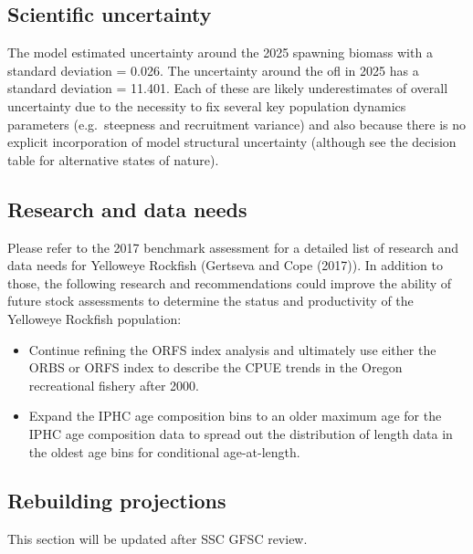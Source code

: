 \documentclass[
]{scrartcl}
\providecommand{\tightlist}{%
  \setlength{\itemsep}{0pt}\setlength{\parskip}{0pt}}\usepackage{longtable,booktabs,array}
\begin{document}
\subsection*{Scientific uncertainty}\label{scientific-uncertainty}

The model estimated uncertainty around the 2025 spawning biomass with a
standard deviation = 0.026. The uncertainty around the \gls{ofl} in 2025
has a standard deviation = 11.401. Each of these are likely
underestimates of overall uncertainty due to the necessity to fix
several key population dynamics parameters (e.g.~steepness and
recruitment variance) and also because there is no explicit
incorporation of model structural uncertainty (although see the decision
table for alternative states of nature).

\subsection*{Research and data needs}\label{research-and-data-needs}

Please refer to the 2017 benchmark assessment for a detailed list of
research and data needs for Yelloweye Rockfish (Gertseva and Cope
(2017)). In addition to those, the following research and
recommendations could improve the ability of future stock assessments to
determine the status and productivity of the Yelloweye Rockfish
population:

\begin{itemize}
\tightlist
\item
  Continue refining the ORFS index analysis and ultimately use either
  the ORBS or ORFS index to describe the CPUE trends in the Oregon
  recreational fishery after 2000.
\item
  Expand the IPHC age composition bins to an older maximum age for the
  IPHC age composition data to spread out the distribution of length
  data in the oldest age bins for conditional age-at-length.
\end{itemize}

\subsection*{Rebuilding projections}\label{rebuilding-projections}

This section will be updated after SSC GFSC review.
\end{document}
